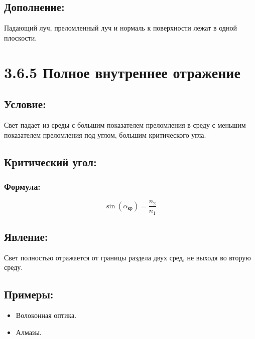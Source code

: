 \documentclass[a4paper,12pt]{article}
\begin{document}
\vspace{-9pt}
\subsection*{Дополнение:}
\vspace{-3pt}
Падающий луч, преломленный луч и нормаль к поверхности лежат в одной плоскости.


\section*{3.6.5 Полное внутреннее отражение}
\vspace{-9pt}
\subsection*{Условие:}
\vspace{-3pt}
Свет падает из среды с большим показателем преломления в среду с меньшим показателем преломления под углом, большим критического угла.

\vspace{-9pt}
\subsection*{Критический угол:}
\vspace{-3pt}
\subsubsection*{Формула:}
\vspace{-0.05em}
$$ \sin(\alpha_{\text{кр}}) = \frac{n_2}{n_1} $$

\vspace{-9pt}
\subsection*{Явление:}
\vspace{-3pt}
Свет полностью отражается от границы раздела двух сред, не выходя во вторую среду.

\vspace{-9pt}
\subsection*{Примеры:}
\vspace{-3pt}
\begin{itemize}
    \item Волоконная оптика.
    \item Алмазы.
\end{itemize}
\end{document}
